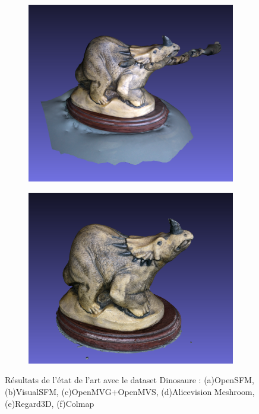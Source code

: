 \begin{figure}[ht]
    \begin{subfigure}{0.37\textwidth}
        \includegraphics[width=\linewidth]{datas/state_of_the_art/regard3d_result_dino.png}
        \caption{}
    \end{subfigure}
    \begin{subfigure}{0.37\textwidth}
        \includegraphics[width=\linewidth]{datas/state_of_the_art/colmap_result_dino.png}
        \caption{}
    \end{subfigure}

    \caption{Résultats de l'état de l'art avec le dataset Dinosaure : (a)OpenSFM, (b)VisualSFM, (c)OpenMVG+OpenMVS, (d)Alicevision Meshroom, (e)Regard3D, (f)Colmap}
    \label{fig:results_etat_art}
\end{figure}

